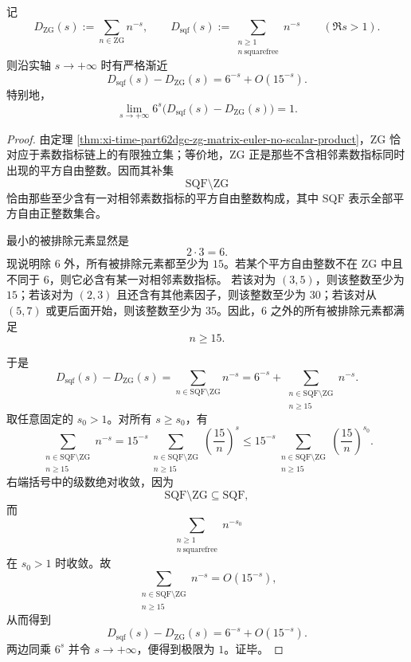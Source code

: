 \begin{theorem}\label{thm:conclusion-zg-vs-squarefree-first-gap-6s}
记
\[
D_{\mathrm{ZG}}(s):=\sum_{n\in \mathrm{ZG}}n^{-s},
\qquad
D_{\mathrm{sqf}}(s):=\sum_{\substack{n\ge 1\\ n\ \mathrm{squarefree}}}n^{-s}
\qquad (\Re s>1).
\]
则沿实轴 \(s\to +\infty\) 时有严格渐近
\[
\boxed{\;
D_{\mathrm{sqf}}(s)-D_{\mathrm{ZG}}(s)=6^{-s}+O(15^{-s}).\;}
\]
特别地，
\[
\boxed{\;
\lim_{s\to+\infty}
6^s\bigl(D_{\mathrm{sqf}}(s)-D_{\mathrm{ZG}}(s)\bigr)=1.\;}
\]
\end{theorem}
\begin{proof}
由定理 \ref{thm:xi-time-part62dgc-zg-matrix-euler-no-scalar-product}，\(\mathrm{ZG}\) 恰对应于素数指标链上的有限独立集；等价地，\(\mathrm{ZG}\) 正是那些不含相邻素数指标同时出现的平方自由整数。因而其补集
\[
\mathrm{SQF}\setminus \mathrm{ZG}
\]
恰由那些至少含有一对相邻素数指标的平方自由整数构成，其中 \(\mathrm{SQF}\) 表示全部平方自由正整数集合。

最小的被排除元素显然是
\[
2\cdot 3=6.
\]
现说明除 \(6\) 外，所有被排除元素都至少为 \(15\)。若某个平方自由整数不在 \(\mathrm{ZG}\) 中且不同于 \(6\)，则它必含有某一对相邻素数指标。
若该对为 \((3,5)\)，则该整数至少为 \(15\)；若该对为 \((2,3)\) 且还含有其他素因子，则该整数至少为 \(30\)；若该对从 \((5,7)\) 或更后面开始，则该整数至少为 \(35\)。因此，\(6\) 之外的所有被排除元素都满足
\[
n\ge 15.
\]

于是
\[
D_{\mathrm{sqf}}(s)-D_{\mathrm{ZG}}(s)
=
\sum_{n\in \mathrm{SQF}\setminus \mathrm{ZG}}n^{-s}
=
6^{-s}
+
\sum_{\substack{n\in \mathrm{SQF}\setminus \mathrm{ZG}\\ n\ge 15}}n^{-s}.
\]
取任意固定的 \(s_0>1\)。对所有 \(s\ge s_0\)，有
\[
\sum_{\substack{n\in \mathrm{SQF}\setminus \mathrm{ZG}\\ n\ge 15}}n^{-s}
=
15^{-s}
\sum_{\substack{n\in \mathrm{SQF}\setminus \mathrm{ZG}\\ n\ge 15}}
\left(\frac{15}{n}\right)^s
\le
15^{-s}
\sum_{\substack{n\in \mathrm{SQF}\setminus \mathrm{ZG}\\ n\ge 15}}
\left(\frac{15}{n}\right)^{s_0}.
\]
右端括号中的级数绝对收敛，因为
\[
\mathrm{SQF}\setminus \mathrm{ZG}\subseteq \mathrm{SQF},
\]
而
\[
\sum_{\substack{n\ge 1\\ n\ \mathrm{squarefree}}}n^{-s_0}
\]
在 \(s_0>1\) 时收敛。故
\[
\sum_{\substack{n\in \mathrm{SQF}\setminus \mathrm{ZG}\\ n\ge 15}}n^{-s}
=
O(15^{-s}),
\]
从而得到
\[
D_{\mathrm{sqf}}(s)-D_{\mathrm{ZG}}(s)=6^{-s}+O(15^{-s}).
\]
两边同乘 \(6^s\) 并令 \(s\to+\infty\)，便得到极限为 \(1\)。证毕。
\end{proof}

